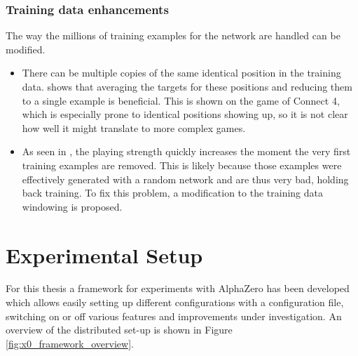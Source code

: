 \documentclass[12pt,onecolumn,oneside,titlepage]{article}
\begin{document}
\subsubsection{Training data enhancements}

The way the millions of training examples for the network are handled can be modified.

\begin{itemize}
 \item There can be multiple copies of the same identical position in the training data. \cite{oracledevs6} shows that averaging the targets for these positions and reducing them to a single example is beneficial.
 This is shown on the game of Connect 4, which is especially prone to identical positions showing up, so it is not clear how well it might translate to more complex games.
 \item As seen in \cite{oracledevs6}, the playing strength quickly increases the moment the very first training examples are removed.
 This is likely because those examples were effectively generated with a random network and are thus very bad, holding back training.
 To fix this problem, a modification to the training data windowing is proposed.
\end{itemize}



\pagebreak

\section{Experimental Setup} \label{s:experiments}

For this thesis a framework for experiments with AlphaZero has been developed which allows easily setting up different configurations with a 
configuration file, switching on or off various features and improvements under investigation.
An overview of the distributed set-up is shown in Figure \ref{fig:x0_framework_overview}.
\end{document}
